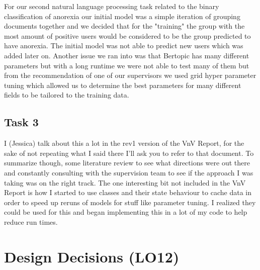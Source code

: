 \documentclass{article}
\begin{document}
For our second natural language processing task related to the binary classification of anorexia our initial model was a simple iteration of grouping documents together and we decided that for the "training" the group with the most amount of positive users would be considered to be the group predicted to have anorexia. The initial model was not able to predict new users which was added later on. Another issue we ran into was that Bertopic has many different parameters but with a long runtime we were not able to test many of them but from the recommendation of one of our supervisors we used grid hyper parameter tuning which allowed us to determine the best parameters for many different fields to be tailored to the training data.

\subsection{Task 3}

I (Jessica) talk about this a lot in the rev1 version of the VnV Report, for the sake of not repeating what I said there I'll ask you to refer to that document. To summarize though, some literature review to see what directions were out there and constantly consulting with the supervision team to see if the approach I was taking was on the right track. The one interesting bit not included in the VnV Report is how I started to use classes and their state behaviour to cache data in order to speed up reruns of models for stuff like parameter tuning. I realized they could be used for this and began implementing this in a lot of my code to help reduce run times.

\section{Design Decisions (LO12)}
\end{document}
